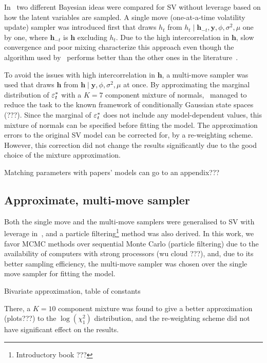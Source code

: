 In~\citet{Kim1998} two different Bayesian ideas were compared for SV without leverage based on how the latent variables are sampled.
A single move (one-at-a-time volatility update) sampler was introduced first that draws $h_t$ from $h_t\mid\bm{h}_{-t},\bm{y},\phi,\sigma^2,\mu$ one by one, where $\bm{h}_{-t}$ is $\bm{h}$ excluding $h_t$.
Due to the high intercorrelation in $\bm{h}$, slow convergence and poor mixing characterize this approach even though the algorithm used by~\citeauthor{Kim1998} performs better than the other ones in the literature~\citep{shephard1993fitting,jarquier1994bayesian,shephard1994comment,shephard1997likelihood,geweke1994bayesian}.

To avoid the issues with high intercorrelation in $\bm{h}$, a multi-move sampler was used that draws $\bm{h}$ from $\bm{h}\mid\bm{y},\phi,\sigma^2,\mu$ at once.
By approximating the marginal distribution of $\varepsilon_t^\ast$ with a $K=7$ component mixture of normals,~\citeauthor{Kim1998} managed to reduce the task to the known framework of conditionally Gaussian state spaces (???).
Since the marginal of $\varepsilon_t^\ast$ does not include any model-dependent values, this mixture of normals can be specified before fitting the model.
The approximation errors to the original SV model can be corrected for, by a re-weighting scheme.
However, this correction did not change the results significantly due to the good choice of the mixture approximation.

Matching parameters with papers' models can go to an appendix???

\subsection[Sampling algorithm]{Approximate, multi-move sampler}

Both the single move and the multi-move samplers were generalised to SV with leverage in~\citet{Omori2007}, and a particle filtering\footnote{Introductory book ???} method was also derived.
In this work, we favor MCMC methods over sequential Monte Carlo (particle filtering) due to the availability of computers with strong processors (wu cloud ???), and, due to its better sampling efficiency, the multi-move sampler was chosen over the single move sampler for fitting the model.

Bivariate approximation, table of constants

There, a $K=10$ component mixture was found to give a better approximation (plots???) to the $\log(\chi^2_1)$ distribution, and the re-weighting scheme did not have significant effect on the results.

